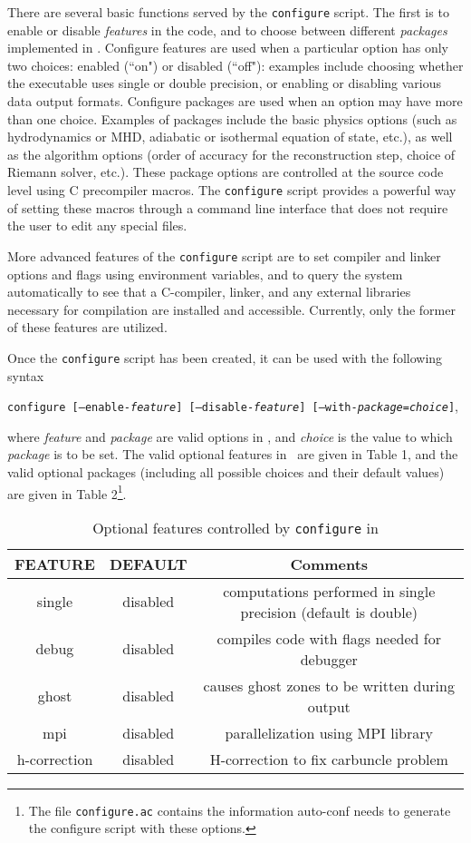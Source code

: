 There are several basic functions served by the {\tt configure} script.
The first is to enable or disable {\it features} in the code, and to
choose between different {\it packages} implemented in \ath.  Configure
features are used when a particular option has only two choices:
enabled (``on") or disabled (``off"): examples include choosing whether
the executable uses single or double precision, or enabling or disabling
various data output formats.  Configure packages are used when an
option may have more than one choice.  Examples of packages include
the basic physics options (such as hydrodynamics or MHD, adiabatic or
isothermal equation of state, etc.), as well as the algorithm options
(order of accuracy for the reconstruction step, choice of Riemann solver,
etc.).  These package options are controlled at the source code
level using C precompiler macros.  The {\tt configure} script provides
a powerful way of setting these macros through a command line interface
that does not require the user to edit any special files.

More advanced features of the {\tt configure} script are to set compiler
and linker options and flags using environment variables, and to query the
system automatically to see that a C-compiler, linker, and any external
libraries necessary for compilation are installed and accessible.
Currently, only the former of these features are utilized.

Once the {\tt configure} script has been created, it can be used
with the following
syntax
\begin{center}
{\tt configure [--enable-{\it feature}] [--disable-{\it feature}]
[--with-{\it package}={\it choice}]},
\end{center}
where {\it feature} and {\it package}
are valid options in \ath, and {\it choice} is the value to which
{\it package} is to be set.  The valid optional features in \ath\ are given in
Table 1, and the valid optional packages (including all possible choices and
their default values) are given in Table 2\footnote{The file {\tt configure.ac}
contains the information auto-conf needs to generate the configure script
with these options.}.

\begin{table}[ht]
\caption{Optional features controlled by {\tt configure} in \ath}
\begin{center}
\begin{tabular}{|c|c|c|} \hline \hline
FEATURE & DEFAULT & Comments \\ \hline
single &  disabled & computations performed in single precision (default is double) \\
debug  & disabled & compiles code with flags needed for debugger \\
ghost  & disabled & causes ghost zones to be written during output \\
mpi    & disabled & parallelization using MPI library \\
h-correction & disabled & H-correction to fix carbuncle problem \\ 
\hline
\end{tabular}
\end{center}
\end{table}


